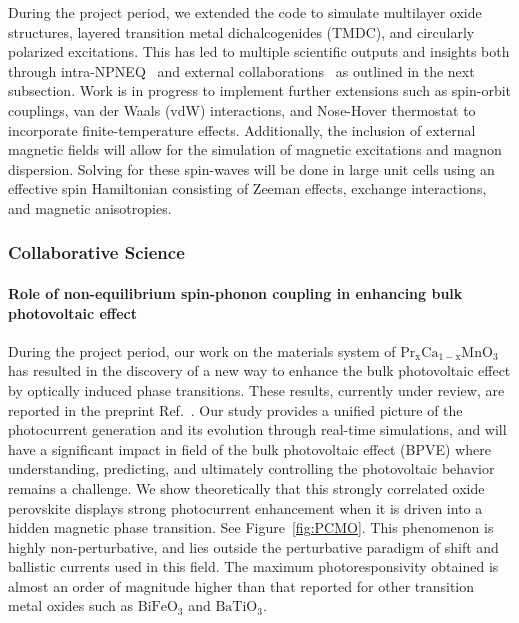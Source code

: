 During the project period, we extended the code to simulate multilayer oxide structures, layered transition metal dichalcogenides (TMDC), and circularly polarized excitations. 
This has led to multiple scientific outputs and insights both through intra-NPNEQ~\cite{Rajpurohit2021} and external collaborations~\cite{Siddiqui2020} as outlined in the next subsection. 
Work is in progress to implement further extensions such as spin-orbit couplings, van der Waals (vdW) interactions, and Nose-Hover thermostat to incorporate finite-temperature effects. 
Additionally, the inclusion of external magnetic fields will allow for the simulation of magnetic excitations and magnon dispersion. 
Solving for these spin-waves will be done in large unit cells using an effective spin Hamiltonian consisting of Zeeman effects, exchange interactions, and magnetic
anisotropies. 

\subsubsection{Collaborative Science}
\label{sec:collaborative}

\paragraph{Role of non-equilibrium spin-phonon coupling in enhancing bulk photovoltaic effect}\label{sec:BPVE}

During the project period, our work on the materials system of \(\mathrm{Pr_xCa_{1-x}MnO_3}\) has resulted in the discovery of a new way to enhance the bulk photovoltaic effect by optically induced phase transitions. 
These results, currently under review, are reported in the preprint Ref.~\cite{Rajpurohit2021}. 
Our study provides a unified picture of the photocurrent generation and its evolution through real-time simulations, and will have a significant impact in field of the bulk photovoltaic effect (BPVE) where understanding, predicting, and ultimately controlling the photovoltaic behavior remains a challenge.
We show theoretically that this strongly correlated oxide perovskite displays strong photocurrent enhancement when it is driven into a hidden magnetic phase transition. See Figure~\ref{fig:PCMO}.
This phenomenon is highly non-perturbative, and lies outside the perturbative paradigm of shift and ballistic currents used in this field. 
The maximum photoresponsivity obtained is almost an order of magnitude higher than that reported for other transition metal oxides such as \(\mathrm{BiFeO_3}\) and \(\mathrm{BaTiO_3}\).

